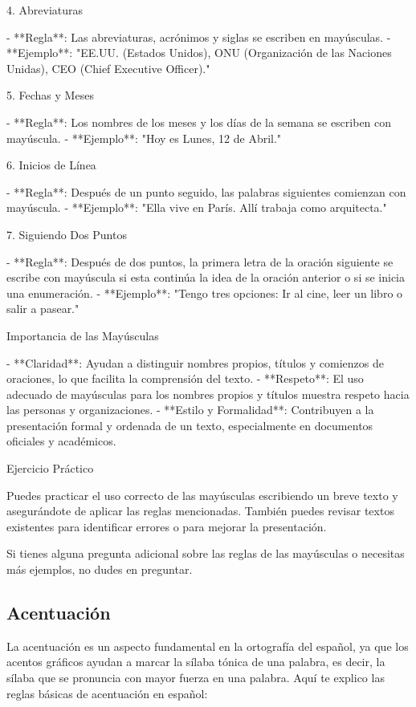  4. Abreviaturas

- **Regla**: Las abreviaturas, acrónimos y siglas se escriben en mayúsculas.
- **Ejemplo**: "EE.UU. (Estados Unidos), ONU (Organización de las Naciones Unidas), CEO (Chief Executive Officer)."

5. Fechas y Meses

- **Regla**: Los nombres de los meses y los días de la semana se escriben con mayúscula.
- **Ejemplo**: "Hoy es Lunes, 12 de Abril."

 6. Inicios de Línea

- **Regla**: Después de un punto seguido, las palabras siguientes comienzan con mayúscula.
- **Ejemplo**: "Ella vive en París. Allí trabaja como arquitecta."

 7. Siguiendo Dos Puntos

- **Regla**: Después de dos puntos, la primera letra de la oración siguiente se escribe con mayúscula si esta continúa la idea de la oración anterior o si se inicia una enumeración.
- **Ejemplo**: "Tengo tres opciones: Ir al cine, leer un libro o salir a pasear."

 Importancia de las Mayúsculas

- **Claridad**: Ayudan a distinguir nombres propios, títulos y comienzos de oraciones, lo que facilita la comprensión del texto.
- **Respeto**: El uso adecuado de mayúsculas para los nombres propios y títulos muestra respeto hacia las personas y organizaciones.
- **Estilo y Formalidad**: Contribuyen a la presentación formal y ordenada de un texto, especialmente en documentos oficiales y académicos.

 Ejercicio Práctico

Puedes practicar el uso correcto de las mayúsculas escribiendo un breve texto y asegurándote de aplicar las reglas mencionadas. También puedes revisar textos existentes para identificar errores o para mejorar la presentación.

Si tienes alguna pregunta adicional sobre las reglas de las mayúsculas o necesitas más ejemplos, no dudes en preguntar.

\subsection{Acentuación}

La acentuación es un aspecto fundamental en la ortografía del español, ya que los acentos gráficos ayudan a marcar la sílaba tónica de una palabra, es decir, la sílaba que se pronuncia con mayor fuerza en una palabra. Aquí te explico las reglas básicas de acentuación en español:


